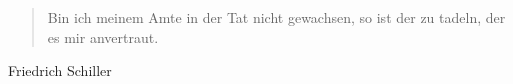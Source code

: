 \documentclass[ngerman]{scrartcl}
\begin{document}
    \crop
    
    \begin{quote}
        Bin ich meinem Amte in der Tat nicht gewachsen, so ist der zu tadeln, der es mir anvertraut.
    \end{quote}
    
    Friedrich Schiller
\end{document}
